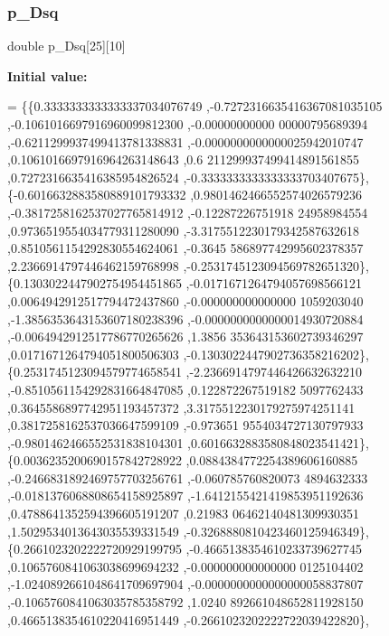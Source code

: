 \mbox{\label{a00452_ac234715c6b9567dfe69fdfd71e22003a}} 
\subsubsection{\texorpdfstring{p\+\_\+\+Dsq}{p\_Dsq}}
{\footnotesize\ttfamily double p\+\_\+\+Dsq\mbox{[}25\mbox{]}\mbox{[}10\mbox{]}}

{\bfseries Initial value\+:}
\begin{DoxyCode}
= \{\{0.3333333333333337034076749 ,-0.7272316635416367081035105 ,-0.1061016697916960099812300 ,-0.00000000000
      00000795689394 ,-0.6211299937499413781338831 ,-0.0000000000000025942010747 ,0.1061016697916964263148643 ,0.6
      211299937499414891561855 ,0.7272316635416385954826524 ,-0.3333333333333333703407675\},
\{-0.6016632883580889101793332 ,0.9801462466552574026579236 ,-0.3817258162537027765814912 ,-0.12287226751918
      24958984554 ,0.9736519554034779311280090 ,-3.3175512230179342587632618 ,0.8510561154292830554624061 ,-0.3645
      586897742995602378357 ,2.2366914797446462159768998 ,-0.2531745123094569782651320\},
\{0.1303022447902754954451865 ,-0.0171671264794057698566121 ,0.0064942912517794472437860 ,-0.000000000000000
      1059203040 ,-1.3856353643153607180238396 ,-0.0000000000000014930720884 ,-0.0064942912517786770265626 ,1.3856
      353643153602739346297 ,0.0171671264794051800506303 ,-0.1303022447902736358216202\},
\{0.2531745123094579774658541 ,-2.2366914797446426632632210 ,-0.8510561154292831664847085 ,0.122872267519182
      5097762433 ,0.3645586897742951193457372 ,3.3175512230179275974251141 ,0.3817258162537036647599109 ,-0.973651
      9554034727130797933 ,-0.9801462466552531838104301 ,0.6016632883580848023541421\},
\{0.0036235200690157842728922 ,0.0884384772254389606160885 ,-0.2466831892469757703256761 ,-0.060785760820073
      4894632333 ,-0.0181376068808654158925897 ,-1.6412155421419853951192636 ,0.4788641352594396605191207 ,0.21983
      06462140481309930351 ,1.5029534013643035539331549 ,-0.3268880810423460125946349\},
\{0.2661023202222720929199795 ,-0.4665138354610233739627745 ,0.1065760841063038699694232 ,-0.000000000000000
      0125104402 ,-1.0240892661048641709697904 ,-0.0000000000000000058837807 ,-0.1065760841063035785358792 ,1.0240
      892661048652811928150 ,0.4665138354610220416951449 ,-0.2661023202222722039422820\},

\end{DoxyCode}
